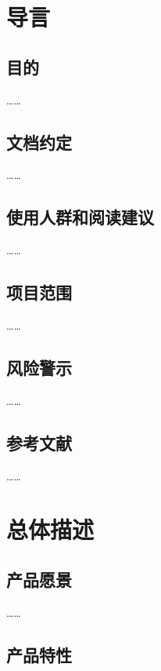\chapter{导言}
\label{ch:intro}

\section{目的}

……

\section{文档约定}

……

\section{使用人群和阅读建议}

……

\section{项目范围}

……

\section{风险警示}

……

\section{参考文献}

……


\newpage


\chapter{总体描述}
\label{ch:Overall Description}

\section{产品愿景}

……

\section{产品特性}

